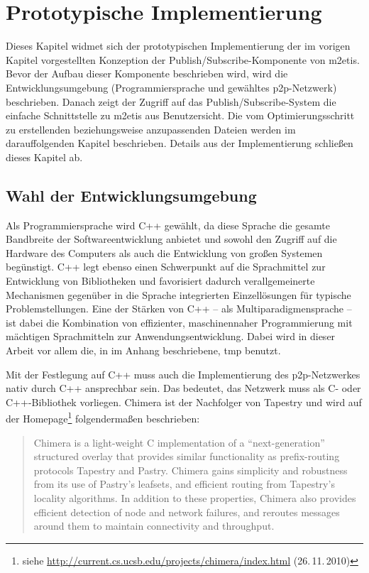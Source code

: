 \chapter{Prototypische Implementierung}
\label{chap:impl}
Dieses Kapitel widmet sich der prototypischen Implementierung der im vorigen Kapitel vorgestellten Konzeption der Publish/Subscribe-Komponente von \ac{m2etis}. Bevor der Aufbau dieser Komponente beschrieben wird, wird die Entwicklungsumgebung (Programmiersprache und gewähltes \ac{p2p}-Netzwerk) beschrieben. Danach zeigt der Zugriff auf das Publish/Subscribe-System die einfache Schnittstelle zu \ac{m2etis} aus Benutzersicht. Die vom Optimierungsschritt zu erstellenden beziehungsweise anzupassenden Dateien werden im darauffolgenden Kapitel beschrieben. Details aus der Implementierung schließen dieses Kapitel ab.

\section{Wahl der Entwicklungsumgebung}
Als Programmiersprache wird C++ gewählt, da diese Sprache die gesamte Bandbreite der Softwareentwicklung anbietet und sowohl den Zugriff auf die Hardware des Computers als auch die Entwicklung von großen Systemen begünstigt. C++ legt ebenso einen Schwerpunkt auf die Sprachmittel zur Entwicklung von Bibliotheken und favorisiert dadurch verallgemeinerte Mechanismen gegenüber in die Sprache integrierten Einzellösungen für typische Problemstellungen. Eine der Stärken von C++ -- als Multiparadigmensprache -- ist dabei die Kombination von effizienter, maschinennaher Programmierung mit mächtigen Sprachmitteln zur Anwendungsentwicklung. Dabei wird in dieser Arbeit vor allem die, in  im Anhang beschriebene, \acf{tmp} benutzt.

Mit der Festlegung auf C++ muss auch die Implementierung des p2p-Netzwerkes nativ durch C++ ansprechbar sein. Das bedeutet, das Netzwerk muss als C- oder C++-Bibliothek vorliegen. Chimera \cite{Allen2006Chimera} ist der Nachfolger von Tapestry und wird auf der Homepage\footnote{siehe \url{http://current.cs.ucsb.edu/projects/chimera/index.html} (26.\,11.\,2010)} folgendermaßen beschrieben: 
\begin{quote}
Chimera is a light-weight C implementation of a \enquote{next-generation} structured overlay that provides similar functionality as prefix-routing protocols Tapestry and Pastry.  Chimera gains simplicity and robustness from its use of Pastry's leafsets, and efficient routing from Tapestry's locality algorithms.  In addition to these properties, Chimera also provides efficient detection of node and network failures, and reroutes messages around them to maintain connectivity and throughput.  
\end{quote}


